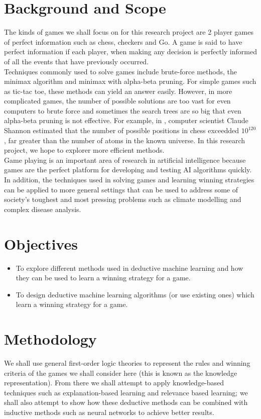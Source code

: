 \documentclass[11pt]{article}
\begin{document}
\section{Background and Scope}
The kinds of games we shall focus on for this research project are 2 player games of perfect information such as chess, checkers and Go. A game is said to have perfect information if each player, when making any decision is perfectly informed of all the events that have previously occurred. \\

Techniques commonly used to solve games include brute-force methods, the minimax algorithm and minimax with alpha-beta pruning. For simple games such as tic-tac toe, these methods can yield an answer easily. However, in more complicated games, the number of possible solutions are too vast for even computers to brute force and sometimes the search trees are so big that even alpha-beta pruning is not effective. For example, in \cite{Shannon:1950:PCP}, computer scientist Claude Shannon estimated that the number of possible positions in chess exceedded ${10}^{120}$, far greater than the number of atoms in the known universe. In this research project, we hope to explorer more efficient methods.\\

Game playing is an important area of research in artificial intelligence because games are the perfect platform for developing and testing AI algorithms quickly. In addition, the techniques used in solving games and learning winning strategies can be applied to more general settings that can be used to address some of society's toughest and most pressing problems such as climate modelling and complex disease analysis.

\section{Objectives}
\begin{itemize}
\item To explore different methods used in deductive machine learning and how they can be used to learn a winning strategy for a game.
\item To design deductive machine learning algorithms (or use existing ones) which learn a winning strategy for a game.
\end{itemize}

\section{Methodology}
We shall use general first-order logic theories to represent the rules and winning criteria of the games we shall consider here (this is known as the knowledge representation). From there we shall attempt to apply knowledge-based techniques such as explanation-based learning and relevance based learning; we shall also attempt to show how these deductive methods can be combined with inductive methods such as neural networks to achieve better results.\\
\end{document}
